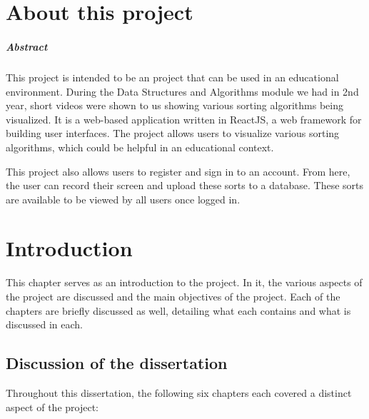 \chapter*{About this project}
\paragraph{Abstract}
This project is intended to be an project that can be used in an educational 
environment. During the Data Structures and Algorithms module we had in 2nd year,
short videos were shown to us showing various sorting algorithms being 
visualized. It is a web-based application written in ReactJS, a web framework 
for building user interfaces. The project allows users to visualize various
sorting algorithms, which could be helpful in an educational context.
\par
\bigskip
This project also allows users to register and sign in to an account. From here, the user can record their screen and upload these sorts to a database. These sorts are available to be viewed by all users once logged in.

\chapter{Introduction}
This chapter serves as an introduction to the project. In it, the various aspects
of the project are discussed and the main objectives of the project. Each of the 
chapters are briefly discussed as well, detailing what each contains and what is
discussed in each.

\section{Discussion of the dissertation}
Throughout this dissertation, the following six chapters each covered a distinct aspect of the project:

